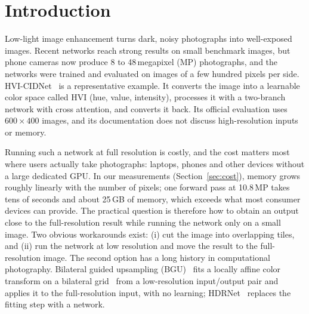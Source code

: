 \documentclass[runningheads]{llncs}
\begin{document}
\section{Introduction}
Low-light image enhancement turns dark, noisy photographs into well-exposed images. Recent networks reach strong results on small benchmark images, but phone cameras now produce 8 to 48\,megapixel (MP) photographs, and the networks were trained and evaluated on images of a few hundred pixels per side. HVI-CIDNet~\cite{hvicidnet} is a representative example. It converts the image into a learnable color space called HVI (hue, value, intensity), processes it with a two-branch network with cross attention, and converts it back. Its official evaluation uses $600{\times}400$ images, and its documentation does not discuss high-resolution inputs or memory.

Running such a network at full resolution is costly, and the cost matters most where users actually take photographs: laptops, phones and other devices without a large dedicated GPU. In our measurements (Section~\ref{sec:cost}), memory grows roughly linearly with the number of pixels; one forward pass at 10.8\,MP takes tens of seconds and about 25\,GB of memory, which exceeds what most consumer devices can provide. The practical question is therefore how to obtain an output close to the full-resolution result while running the network only on a small image. Two obvious workarounds exist: (i) cut the image into overlapping tiles, and (ii) run the network at low resolution and move the result to the full-resolution image. The second option has a long history in computational photography. Bilateral guided upsampling (BGU)~\cite{bgu} fits a locally affine color transform on a bilateral grid~\cite{bilateralgrid} from a low-resolution input/output pair and applies it to the full-resolution input, with no learning; HDRNet~\cite{hdrnet} replaces the fitting step with a network.
\end{document}
